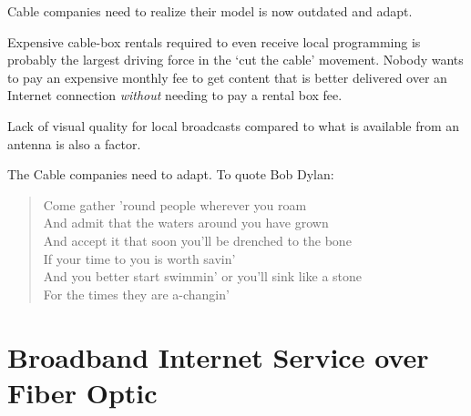 Cable companies need to realize their model is now outdated and adapt.

Expensive cable-box rentals required to even receive local programming is probably the largest
driving force in the `cut the cable' movement. Nobody wants to pay an expensive monthly fee to
get content that is better delivered over an Internet connection \emph{without} needing to
pay a rental box fee.

Lack of visual quality for local broadcasts compared to what is available from an antenna is
also a factor.

The Cable companies need to adapt. To quote Bob Dylan:

\begin{quotation}
\noindent Come gather 'round people wherever you roam\\
And admit that the waters around you have grown\\
And accept it that soon you'll be drenched to the bone\\
If your time to you is worth savin'\\
And you better start swimmin' or you'll sink like a stone\\
For the times they are a-changin'
\end{quotation}


\section{Broadband Internet Service over Fiber Optic}
\label{apx:triple:internet}























